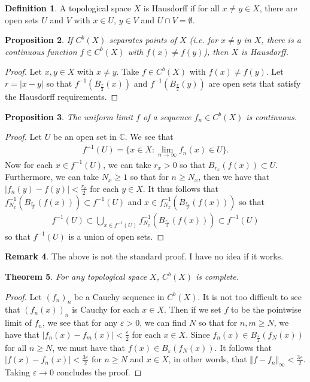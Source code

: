 \documentclass[11pt]{amsart}
\newtheorem{theorem}{Theorem}[section]
\newtheorem{proposition}[theorem]{Proposition}
\theoremstyle{definition}
\newtheorem{definition}[theorem]{Definition}
\newtheorem{remark}[theorem]{Remark}
\numberwithin{equation}{section}
\begin{document}
\begin{definition}
    A topological space $X$ is Hausdorff if for all $x\ne y\in X$, there are open sets $U$ and $V$ with $x\in U$, $y\in V$ and $U\cap V=\emptyset$.
\end{definition}
\begin{proposition}
    If $C^b(X)$ separates points of $X$ (i.e. for $x\ne y$ in $X$, there is a continuous function $f\in C^b(X)$ with $f(x)\ne f(y)$), then $X$ is Hausdorff.
\end{proposition}
\begin{proof}
    Let $x,y\in X$ with $x\ne y$. Take $f\in C^b(X)$ with $f(x)\ne f(y)$. Let $r=|x-y|$ so that $f^{-1}(B_\frac{r}{2}(x))$ and $f^{-1}(B_\frac{r}{2}(y))$ are open sets that satisfy the Hausdorff requirements.
\end{proof}
\begin{proposition}
    The uniform limit $f$ of a sequence $f_n\in C^b(X)$ is continuous.
\end{proposition}
\begin{proof}
    Let $U$ be an open set in $\mathbb C$. We see that
    \begin{align*}
        f^{-1}(U)=\{x\in X:\lim_{n\to\infty}f_n(x)\in U\}.
    \end{align*}
    Now for each $x\in f^{-1}(U)$, we can take $r_x>0$ so that $B_{r_x}(f(x))\subset U$. Furthermore, we can take $N_x\ge 1$ so that for $n\ge N_x$, then we have that $|f_n(y)-f(y)|<\frac{r_x}{2}$ for each $y\in X$. It thus follows that $f_{N_x}^{-1}(B_{\frac{r_x}{2}}(f(x)))\subset f^{-1}(U)$ and $x\in f_{N_x}^{-1}(B_{\frac{r_x}{2}}(f(x)))$ so that
    \begin{align*}
        f^{-1}(U)\subset \bigcup_{x\in f^{-1}(U)}f_{N_x}^{-1}(B_{\frac{r_x}{2}}(f(x)))\subset f^{-1}(U)
    \end{align*}
    so that $f^{-1}(U)$ is a union of open sets.
\end{proof}
\begin{remark}
    The above is not the standard proof. I have no idea if it works.
\end{remark}
\begin{theorem}
    For any topological space $X$, $C^b(X)$ is complete.
\end{theorem}
\begin{proof}
    Let $(f_n)_n$ be a Cauchy sequence in $C^b(X)$. It is not too difficult to see that $(f_n(x))_n$ is Cauchy for each $x\in X$. Then if we set $f$ to be the pointwise limit of $f_n$, we see that for any $\varepsilon>0$, we can find $N$ so that for $n,m\ge N$, we have that $|f_n(x)-f_m(x)|<\frac{\varepsilon}{2}$ for each $x\in X$. Since $f_n(x)\in B_\frac{\varepsilon}{2}(f_N(x))$ for all $n\ge N$, we must have that $f(x)\in B_\varepsilon(f_N(x))$. It follows that $|f(x)-f_n(x)|<\frac{3\varepsilon}{2}$ for $n\ge N$ and $x\in X$, in other words, that $\Vert f-f_n\Vert_\infty<\frac{3\varepsilon}{2}$. Taking $\varepsilon\to0$ concludes the proof.
\end{proof}
\end{document}
